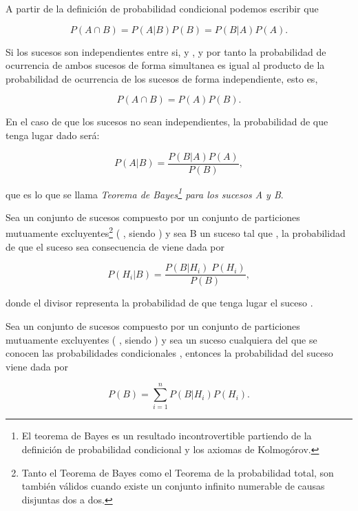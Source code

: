 A partir de la definición de probabilidad condicional podemos escribir que

\begin{equation*}
    P(A \cap B)=P(A|B)P(B)=P(B|A)P(A).
\end{equation*}

Si los sucesos son independientes entre si,  y ,
y por tanto la probabilidad de ocurrencia de ambos sucesos de forma simultanea es igual al producto de la probabilidad de ocurrencia de los sucesos de forma independiente, esto es,

\begin{equation*}
    P(A \cap B)=P(A)P(B).
\end{equation*}

En el caso de que los sucesos no sean independientes, la probabilidad de que tenga lugar  dado  será:

\begin{equation*}
    P(A|B)=\frac{P(B|A) P(A)}{P(B)},
\end{equation*}

que es lo que se llama \textit{Teorema de Bayes\footnote{El teorema de Bayes es un resultado incontrovertible partiendo de la definición de probabilidad condicional y los axiomas de Kolmogórov.} para los sucesos A y B}.

\begin{theorem}
Sea \maths{\Omega} un conjunto de sucesos %
compuesto por un conjunto  de particiones mutuamente excluyentes\footnote{Tanto el Teorema de Bayes como el Teorema de la probabilidad total, son también válidos cuando existe un conjunto infinito numerable de causas disjuntas dos a dos.} ( ,   siendo ) y sea B un suceso tal que , la probabilidad de que el suceso  sea consecuencia de  viene dada por

\begin{equation}\label{eq:teorema_bayes}
    P(H_i|B)=\frac{P(B|H_i)\;P(H_i)}{P(B)},
\end{equation}

donde el divisor  representa la probabilidad de que tenga lugar el suceso .
\end{theorem}

\begin{theorem}

Sea \maths{\Omega} un conjunto de sucesos compuesto por un conjunto  de particiones mutuamente excluyentes  ( ,   siendo ) y sea  un suceso cualquiera del que se conocen las probabilidades condicionales ,  entonces la probabilidad del suceso  viene dada por

\begin{equation}
    P(B)=\sum_{i=1}^{n}{P(B|H_i)P(H_i)}.
\end{equation}

\end{theorem}

